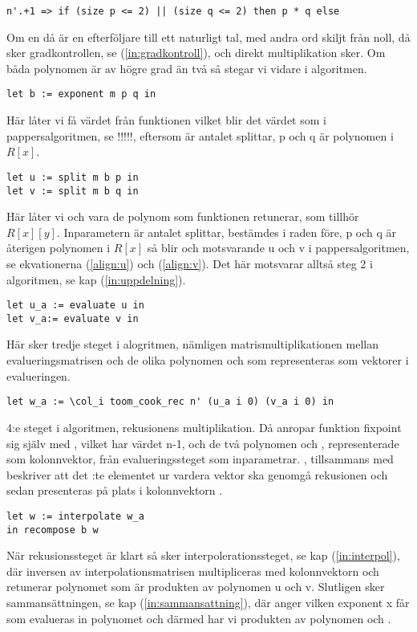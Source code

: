 \begin{lstlisting}
n'.+1 => if (size p <= 2) || (size q <= 2) then p * q else
\end{lstlisting}

Om en  då är en efterföljare till ett naturligt tal, med andra ord skiljt
från noll, då sker gradkontrollen, se (\ref{in:gradkontroll}), och direkt
multiplikation sker. Om båda polynomen är av högre grad än två så stegar vi
vidare i algoritmen.

\begin{lstlisting}
let b := exponent m p q in
\end{lstlisting}

Här låter vi  få värdet från funktionen  vilket blir det
värdet som i pappersalgoritmen, se !!!!!, eftersom  är antalet splittar, p
och q är polynomen i $R[x]$.

\begin{lstlisting}
let u := split m b p in
let v := split m b q in
\end{lstlisting}

Här låter vi  och  vara de polynom som funktionen 
retunerar, som tillhör $R[x][y]$. Inparametern  är antalet splittar, 
bestämdes i raden före, p och q är återigen polynomen i $R[x]$ så blir 
och  motsvarande u och v i pappersalgoritmen, se ekvationerna
(\ref{align:u}) och (\ref{align:v}). Det här motsvarar alltså steg 2 i
algoritmen, se kap (\ref{in:uppdelning}).

\begin{lstlisting}
let u_a := evaluate u in
let v_a:= evaluate v in
\end{lstlisting}

Här sker tredje steget i alogritmen, nämligen matrismultiplikationen mellan
evalueringsmatrisen och de olika polynomen  och  som representeras
som vektorer i evalueringen.

\begin{lstlisting}
let w_a := \col_i toom_cook_rec n' (u_a i 0) (v_a i 0) in
\end{lstlisting}

4:e steget i algoritmen, rekusionens multiplikation. Då anropar funktion
fixpoint sig själv med , vilket har värdet n-1, och de två polynomen
 och , representerade som kolonnvektor, från evalueringssteget som
inparametrar. ,  tillsammans med  beskriver
att det :te elementet ur vardera vektor ska genomgå rekusionen och sedan
presenteras på plats  i kolonnvektorn .

\begin{lstlisting}
let w := interpolate w_a
in recompose b w
\end{lstlisting}

När rekusionssteget är klart så sker interpolerationssteget, se kap
(\ref{in:interpol}), där inversen av interpolationsmatrisen multipliceras med
kolonnvektorn  och retunerar polynomet  som är produkten av
polynomen u och v. Slutligen sker sammansättningen, se kap
(\ref{in:sammansattning}), där  anger vilken exponent x får som evalueras
in polynomet  och därmed har vi produkten av polynomen  och .
